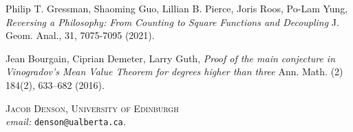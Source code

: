 \documentclass[12pt]{article}
\begin{document}
\begin{thebibliography}{03}

 Philip T. Gressman, Shaoming Guo, Lillian B. Pierce, Joris Roos, Po-Lam Yung,
\emph{ Reversing a Philosophy: From Counting to Square Functions and Decoupling} 
J. Geom. Anal., 31, 7075-7095 (2021).

 Jean Bourgain, Ciprian Demeter, Larry Guth,
\emph{Proof of the main conjecture in Vinogradov’s Mean Value Theorem for degrees higher than three}
Ann. Math. (2) 184(2), 633–682 (2016).




\end{thebibliography}

\noindent \textsc{Jacob Denson, University of Edinburgh}\\
\textit{email:} \texttt{denson@ualberta.ca}.

\end{document}
